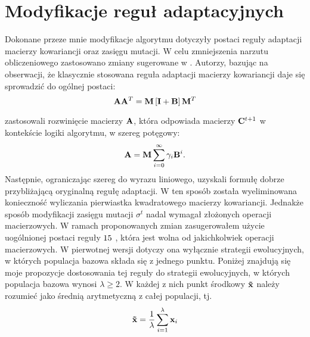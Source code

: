 \section{Modyfikacje reguł adaptacyjnych}
\label{section:modyfikacje}
  Dokonane przeze mnie modyfikacje algorytmu dotyczyły postaci 
  reguły adaptacji macierzy kowariancji oraz zasięgu mutacji.
  W celu zmniejszenia narzutu obliczeniowego zastosowano zmiany sugerowane
  w \cite{SMAES}. Autorzy, bazując na obserwacji, że klasycznie stosowana reguła adaptacji macierzy kowariancji daje się sprowadzić do ogólnej postaci:
    \begin{equation}
      {\bf A}{\bf A}^{T} = {\bf M}\left[{\bf I} + {\bf B}\right]{\bf M}^{T}
    \end{equation}

    zastosowali rozwinięcie macierzy ${\bf A}$, która odpowiada macierzy ${\bf C}^{t+1}$ w kontekście logiki algorytmu, w szereg potęgowy:
    \begin{equation}
      {\bf A} = {\bf M}\sum^{\infty}_{i = 0}\gamma_{i}{\bf B}^{i}. 
    \end{equation}
    Następnie, ograniczając szereg do wyrazu liniowego, uzyskali formułę dobrze
    przybliżającą oryginalną regułę adaptacji.
    W ten sposób została wyeliminowana konieczność wyliczania pierwiastka kwadratowego macierzy kowariancji.
    Jednakże sposób modyfikacji zasięgu mutacji $\sigma^{t}$ nadal wymagał złożonych operacji macierzowych.
    W ramach proponowanych zmian zasugerowałem użycie uogólnionej postaci reguły $1\\5$ \cite{Schwefel95}, która jest wolna od jakichkolwiek operacji macierzowych. W pierwotnej wersji dotyczy ona wyłącznie strategii ewolucyjnych, w których populacja bazowa składa się z jednego punktu.
    Poniżej znajdują się moje propozycje dostosowania tej reguły do strategii ewolucyjnych, w których populacja bazowa wynosi $\lambda \geq 2$. W każdej z nich punkt środkowy ${\bf \tilde x}$ należy rozumieć jako średnią arytmetyczną z całej populacji, tj.
    \begin{equation}
      {\bf \tilde x} = \frac{1}{\lambda}\sum^{\lambda}_{i = 1} {\bf x}_{i}
    \end{equation}

